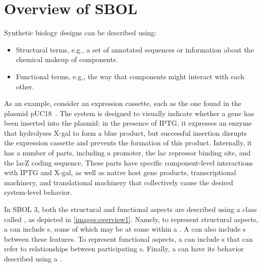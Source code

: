 \section{Overview of SBOL}

Synthetic biology designs can be described using:
\begin{itemize}
\item Structural terms, e.g., a set of annotated sequences or information about the chemical makeup of components.
\item Functional terms, e.g., the way that components might interact with each other. 
\end{itemize}

As an example, consider an expression cassette, such as the one found in the plasmid pUC18~\cite{L08752.1}.
The system is designed to visually indicate whether a gene has been inserted into the plasmid: 
in the presence of IPTG, it expresses an enzyme that hydrolyses X-gal to form a blue product, but successful insertion disrupts the expression cassette and prevents the formation of this product. 
Internally, it has a number of parts, including a promoter, the lac repressor binding site, and the lacZ coding sequence.
These parts have specific component-level interactions with IPTG and X-gal, as well as native host gene products, transcriptional machinery, and translational machinery that collectively cause the desired system-level behavior.

In SBOL 3, both the structural and functional aspects are described using a class called , as depicted in \ref{images:overview1}.  
Namely, to represent structural aspects, a  can include s, some of which may be at some  within a .  
A  can also include s between these features.  
To represent functional aspects, a  can include s that can refer to relationships between participating s.  
Finally, a  can have its behavior described using a .

